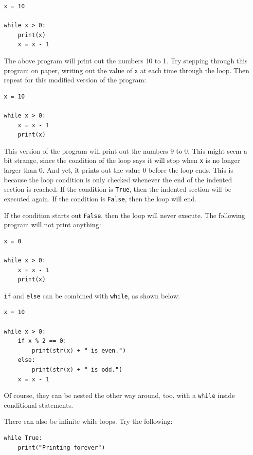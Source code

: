 \documentclass[11pt,hidelinks]{article}
\begin{document}
\begin{lstlisting}[style=python]
x = 10

while x > 0:
    print(x)
    x = x - 1
\end{lstlisting}

The above program will print out the numbers 10 to 1. Try stepping through this
program on paper, writing out the value of \lstinline{x} at each time through
the loop. Then repeat for this modified version of the program:

\begin{lstlisting}[style=python]
x = 10

while x > 0:
    x = x - 1
    print(x)
\end{lstlisting}

This version of the program will print out the numbers 9 to 0. This might seem a
bit strange, since the condition of the loop says it will stop when
\lstinline{x} is no longer larger than 0. And yet, it prints out the value 0
before the loop ends. This is because the loop condition is only checked
whenever the end of the indented section is reached. If the condition is
\lstinline{True}, then the indented section will be executed again. If the
condition is \lstinline{False}, then the loop will end.

If the condition starts out \lstinline{False}, then the loop will never execute.
The following program will not print anything:

\begin{lstlisting}[style=python]
x = 0

while x > 0:
    x = x - 1
    print(x)
\end{lstlisting}

\lstinline{if} and \lstinline{else} can be combined with \lstinline{while}, as
shown below:

\begin{lstlisting}[style=python]
x = 10

while x > 0:
    if x % 2 == 0:
        print(str(x) + " is even.")
    else:
        print(str(x) + " is odd.")
    x = x - 1
\end{lstlisting}

Of course, they can be nested the other way around, too, with a
\lstinline!while! inside conditional statements.

There can also be infinite while loops. Try the following:
\begin{lstlisting}
while True:
    print("Printing forever")
\end{lstlisting}
\end{document}
